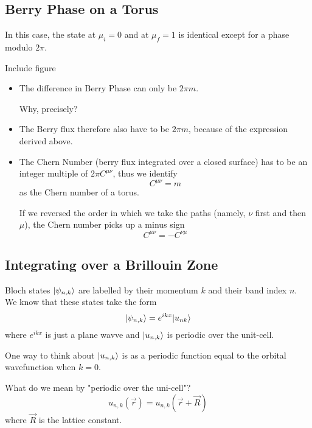 \documentclass[11pt]{article}
\begin{document}
\subsection{Berry Phase on a Torus}
In this case, the state at $\mu_i = 0$ and at $\mu_f = 1$ is identical except for a phase modulo $2\pi$. 
\begin{center}
  Include figure
\end{center}
\begin{itemize}
  \item The difference in Berry Phase can only be $2\pi m$. \begin{note}
    {Why, precisely?}
  \end{note}
  \item The Berry flux therefore also have to be $2\pi m$, because of the expression derived above.
  \item The Chern Number (berry flux integrated over a closed surface) has to be an integer multiple of $2\pi C^{\mu \nu}$, thus we identify $$ C^{\mu \nu} = m $$ as the Chern number of a torus.
  \begin{remark}
    {If we reversed the order in which we take the paths (namely, $\nu$ first and then $\mu$), the Chern number picks up a minus sign $$ C^{\mu \nu} = - C^{\nu \mu} $$}
  \end{remark}
\end{itemize}

\vskip 1cm
\subsection{Integrating over a Brillouin Zone}

Bloch states $\lvert\psi_{n,k}\rangle$ are labelled by their momentum $k$ and their band index $n$. We know that these states take the form $$ \lvert\psi_{n,k}\rangle = e^{ikx} \lvert u_{nk}\rangle $$ where $e^{ikx}$ is just a plane wavve and $\lvert u_{n,k}\rangle$ is periodic over the unit-cell. 

\begin{remark}
  {One way to think about $\lvert u_{n,k}\rangle$ is as a periodic function equal to the orbital wavefunction when $k=0$.}
\end{remark} What do we mean by "periodic over the uni-cell"? $$ u_{n,k}(\vec{r}) = u_{n,k}(\vec{r} + \vec{R}) $$ where $\vec{R}$ is the lattice constant.
\end{document}
